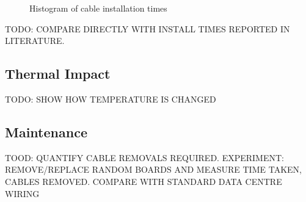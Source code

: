 			\begin{figure}
				
				\caption{Histogram of cable installation times}
				\label{fig:install-histogram}
			\end{figure}
			
			TODO: COMPARE DIRECTLY WITH INSTALL TIMES REPORTED IN LITERATURE.
		
		\subsection{Thermal Impact}
			
			TODO: SHOW HOW TEMPERATURE IS CHANGED
			
		\subsection{Maintenance}
			
			TOOD: QUANTIFY CABLE REMOVALS REQUIRED. EXPERIMENT: REMOVE/REPLACE RANDOM
			BOARDS AND MEASURE TIME TAKEN, CABLES REMOVED. COMPARE WITH STANDARD DATA
			CENTRE WIRING
